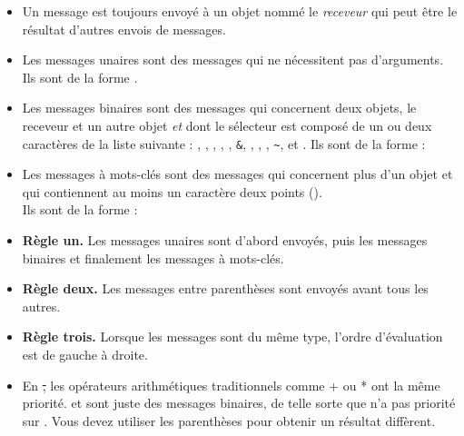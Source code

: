 \documentclass[a4paper,10pt,twoside]{book}
\begin{document}
\begin{itemize}
\item Un message est toujours envoy\'e \`a un objet nomm\'e le \emph{receveur} qui peut \^etre le r\'esultat d'autres envois de messages.

\item Les messages unaires sont des messages qui ne n\'ecessitent pas d'arguments.\\
Ils sont de la forme .

\item Les messages binaires sont des messages qui concernent deux objets, le receveur et un autre objet \emph{et} dont le s\'electeur est compos\'e de un ou deux caract\`eres de la liste suivante : \ct{+}, \ct{-}, \ct{*}, \ct{/}, \ct{|}, \texttt{\&}, \ct{=}, \ct{>}, \ct{<}, \texttt{\~}, et .
Ils sont de la forme : 
\item Les messages \`a mots-cl\'es sont des messages qui concernent plus d'un objet et qui contiennent au moins un caract\`ere deux points (\ct{\:}). \\
Ils sont de la forme : 

\item \textbf{R\`egle un.} Les messages unaires sont d'abord envoy\'es, puis les messages binaires et finalement les messages \`a mots-cl\'es.
\item \textbf{R\`egle deux.} Les messages entre parenth\`eses sont envoy\'es avant tous les autres.
\item \textbf{R\`egle trois.} Lorsque les messages sont du m\^eme type, l'ordre d'\'evaluation est de gauche \`a droite.
\item En \st, les op\'erateurs arithm\'etiques traditionnels comme + ou * ont la m\^eme priorit\'e. \ct{+} et \ct{*} sont juste des messages binaires, de telle sorte que \ct{*} n'a pas priorit\'e sur \ct{+}. Vous devez utiliser les parenth\`eses pour obtenir un r\'esultat diff\`erent.
\end{itemize}

\ifx\wholebook\relax\else
\end{document}
